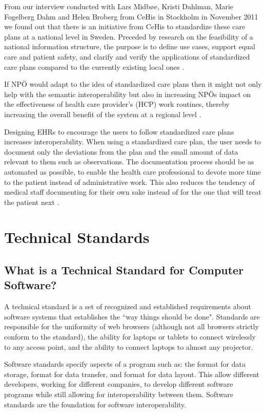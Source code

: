 \documentclass[14pt]{article}
\begin{document}
From our interview conducted with Lars Midbøe, Kristi Dahlman, Marie Fogelberg Dahm and Helen Broberg from \gls{CeHis} in Stockholm in November 2011 we found out that there is an initiative from \gls{CeHis} to standardize these care plans at a national level in Sweden. Preceded by research on the feasibility of a national information structure, the purpose is to define use cases, support equal care and patient safety, and clarify and verify the applications of standardized care plans compared to the currently existing local ones \cite{CeHis}.

If NPÖ would adapt to the idea of standardized care plans then it might not only help with the semantic interoperability but also in increasing NPÖs impact on the effectiveness of health care provider's (HCP) work routines, thereby increasing the overall benefit of the system at a regional level \cite{Cambio}.

Designing \glspl{EHR} to encourage the users to follow standardized care plans increases interoperability. When using a standardized care plan, the user needs to document only the deviations from the plan and the small amount of data relevant to them such as observations. The documentation process should be as automated as possible, to enable the health care professional to devote more time to the patient instead of administrative work. This also reduces the tendency of medical staff documenting for their own sake instead of for the one that will treat the patient next \cite{Cambio}.

\newpage

\section{Technical Standards}
\label{sec:TechnicalStandards}

\subsection{What is a Technical Standard for Computer Software?}
\label{sec:technicalStandardsWhatIs}
A technical standard is a set of recognized and established requirements about software systems that establishes the ``way things should be done". Standards are responsible for the uniformity of web browsers (although not all browsers strictly conform to the standard), the ability for laptops or tablets to connect wirelessly to any access point, and the ability to connect laptops to almost any projector.

Software standards specify aspects of a program such as: the format for data storage, format for data transfer, and format for data layout. This allow different developers, working for different companies, to develop different software programs while still allowing for \gls{interoperability} between them. Software standards are the foundation for software \gls{interoperability}.
\end{document}
